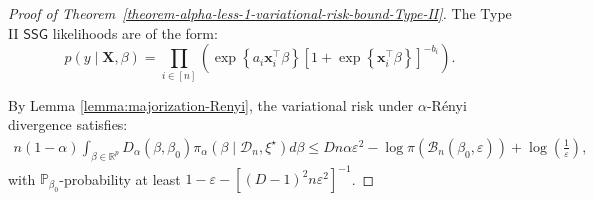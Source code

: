\documentclass[10pt,a4paper]{amsart}
\begin{document}
\begin{proof}[Proof of Theorem~\ref{theorem-alpha-less-1-variational-risk-bound-Type-II}]
The Type II $\mathsf{SSG}$ likelihoods are of the form:
%
\begin{equation}\label{eq:proof-theorem2-1}
p(y\mid \mathbf{X}, \beta) = \prod_{i\in [n]}\left(\exp\left\{a_i\mathbf{x}_{i}^{\top}\beta\right\}\left[1 + \exp\left\{\mathbf{x}_{i}^{\top}\beta\right\}\right]^{- b_i}\right).
\end{equation}

By Lemma \ref{lemma:majorization-Renyi}, the variational risk under $\alpha$-R\'{e}nyi divergence satisfies:
\begin{align}\label{eq:proof-theorem2-2}
        n(1-\alpha)\int_{\beta\in \mathbb{R}^{p}}D_{\alpha}(\beta, \beta_{0})\pi_{\alpha}(\beta \mid \mathcal{D}_n, \xi^{\star})d\beta
        \leq Dn\alpha\varepsilon^2 - \log \pi(\mathcal{B}_n(\beta_0, \varepsilon)) + \log\left(\frac{1}{\varepsilon}\right),
\end{align}
with $\mathbb{P}_{\beta_0}$-probability at least $1-\varepsilon-[(D-1)^2n\varepsilon^2]^{-1}$.


\end{proof}
\end{document}
